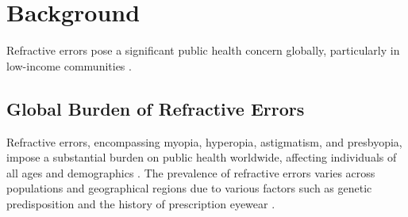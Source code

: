 \section{Background}
Refractive errors pose a significant public health concern globally, particularly in low-income communities \parencite{world2019report}. 

\subsection*{Global Burden of Refractive Errors}
Refractive errors, encompassing \gls{myopia}, \gls{hyperopia}, \gls{astigmatism}, and \gls{presbyopia}, impose a substantial burden on public health worldwide, affecting individuals of all ages and demographics \parencite{morgan2012worldwide}. The prevalence of refractive errors varies across populations and geographical regions due to various factors such as genetic predisposition and the history of prescription eyewear \parencite{flitcroft2012global, sherwin2012environmental}.
